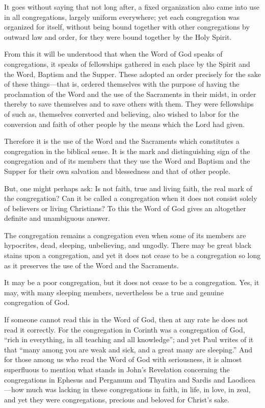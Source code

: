 It goes without saying that not long after, a fixed organization also came into use in all congregations, largely uniform everywhere; yet each congregation was organized for itself, without being bound together with other congregations by outward law and order, for they were bound together by the Holy Spirit.

From this it will be understood that when the Word of God speaks of congregations, it speaks of fellowships gathered in each place by the Spirit and the Word, Baptism and the Supper. These adopted an order precisely for the sake of these things—that is, ordered themselves with the purpose of having the proclamation of the Word and the use of the Sacraments in their midst, in order thereby to save themselves and to save others with them. They were fellowships of such as, themselves converted and believing, also wished to labor for the conversion and faith of other people by the means which the Lord had given.

Therefore it is the use of the Word and the Sacraments which constitutes a congregation in the biblical sense. It is the mark and distinguishing sign of the congregation and of its members that they use the Word and Baptism and the Supper for their own salvation and blessedness and that of other people.

But, one might perhaps ask: Is not faith, true and living faith, the real mark of the congregation? Can it be called a congregation when it does not consist solely of believers or living Christians? To this the Word of God gives an altogether definite and unambiguous answer.

The congregation remains a congregation even when some of its members are hypocrites, dead, sleeping, unbelieving, and ungodly. There may be great black stains upon a congregation, and yet it does not cease to be a congregation so long as it preserves the use of the Word and the Sacraments.

It may be a poor congregation, but it does not cease to be a congregation. Yes, it may, with many sleeping members, nevertheless be a true and genuine congregation of God.

If someone cannot read this in the Word of God, then at any rate he does not read it correctly. For the congregation in Corinth was a congregation of God, “rich in everything, in all teaching and all knowledge”; and yet Paul writes of it that “many among you are weak and sick, and a great many are sleeping.” And for those among us who read the Word of God with seriousness, it is almost superfluous to mention what stands in John’s Revelation concerning the congregations in Ephesus and Pergamum and Thyatira and Sardis and Laodicea—how much was lacking in these congregations in faith, in life, in love, in zeal, and yet they were congregations, precious and beloved for Christ’s sake.

